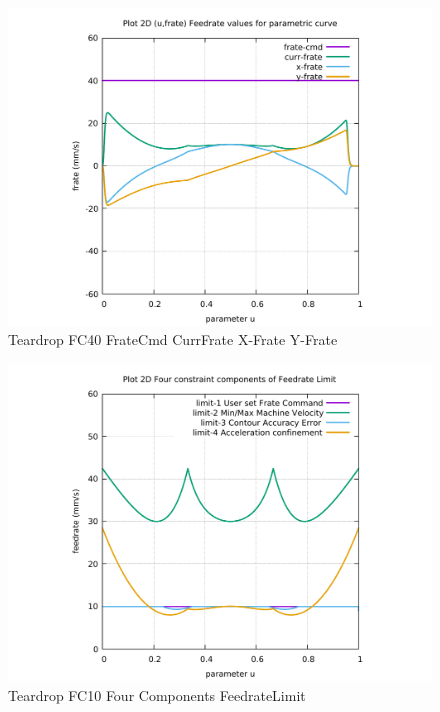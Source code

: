 \begin{figure}
	\caption     {Teardrop FC40 FrateCmd CurrFrate X-Frate Y-Frate}
	\label{30-img-Teardrop-FC40-FrateCmd-CurrFrate-X-Frate-Y-Frate.pdf}
	\includegraphics[width=1.00\textwidth]{Chap4/appendix/app-Teardrop/plots/30-img-Teardrop-FC40-FrateCmd-CurrFrate-X-Frate-Y-Frate.pdf}
\end{figure}


\clearpage
\pagebreak

\begin{figure}
	\caption     {Teardrop FC10 Four Components FeedrateLimit}
	\label{31-img-Teardrop-FC10-Four-Components-FeedrateLimit.pdf}
	\includegraphics[width=1.00\textwidth]{Chap4/appendix/app-Teardrop/plots/31-img-Teardrop-FC10-Four-Components-FeedrateLimit.pdf}
\end{figure}


